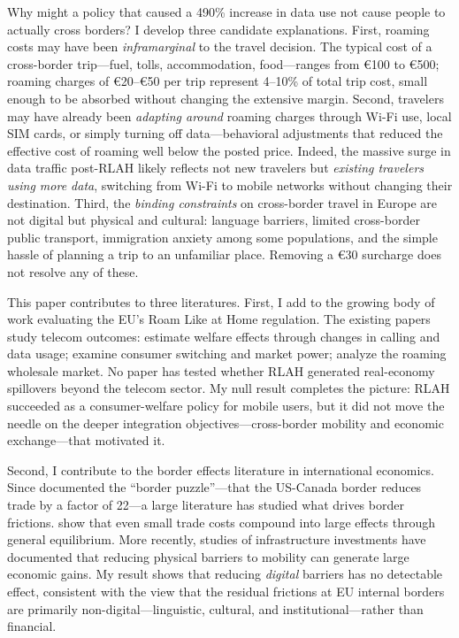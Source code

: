 \documentclass[12pt]{article}
\newcommand{\EUR}[1]{\euro#1}
\begin{document}
Why might a policy that caused a 490\% increase in data use not cause people to actually cross borders? I develop three candidate explanations. First, roaming costs may have been \textit{inframarginal} to the travel decision. The typical cost of a cross-border trip---fuel, tolls, accommodation, food---ranges from \EUR{100} to \EUR{500}; roaming charges of \EUR{20}--\EUR{50} per trip represent 4--10\% of total trip cost, small enough to be absorbed without changing the extensive margin. Second, travelers may have already been \textit{adapting around} roaming charges through Wi-Fi use, local SIM cards, or simply turning off data---behavioral adjustments that reduced the effective cost of roaming well below the posted price. Indeed, the massive surge in data traffic post-RLAH likely reflects not new travelers but \textit{existing travelers using more data}, switching from Wi-Fi to mobile networks without changing their destination. Third, the \textit{binding constraints} on cross-border travel in Europe are not digital but physical and cultural: language barriers, limited cross-border public transport, immigration anxiety among some populations, and the simple hassle of planning a trip to an unfamiliar place. Removing a \EUR{30} surcharge does not resolve any of these.

This paper contributes to three literatures. First, I add to the growing body of work evaluating the EU's Roam Like at Home regulation. The existing papers study telecom outcomes: \citet{quinn2024} estimate welfare effects through changes in calling and data usage; \citet{grzybowski2023} examine consumer switching and market power; \citet{verboven2024} analyze the roaming wholesale market. No paper has tested whether RLAH generated real-economy spillovers beyond the telecom sector. My null result completes the picture: RLAH succeeded as a consumer-welfare policy for mobile users, but it did not move the needle on the deeper integration objectives---cross-border mobility and economic exchange---that motivated it.

Second, I contribute to the border effects literature in international economics. Since \citet{mccallum1995} documented the ``border puzzle''---that the US-Canada border reduces trade by a factor of 22---a large literature has studied what drives border frictions. \citet{anderson2003} show that even small trade costs compound into large effects through general equilibrium. More recently, studies of infrastructure investments \citep{faber2014, donaldson2016, campante2018} have documented that reducing physical barriers to mobility can generate large economic gains. My result shows that reducing \textit{digital} barriers has no detectable effect, consistent with the view that the residual frictions at EU internal borders are primarily non-digital---linguistic, cultural, and institutional---rather than financial.
\end{document}
